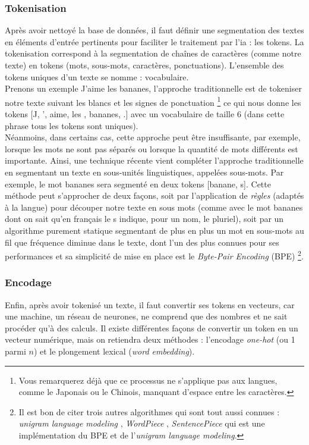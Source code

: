\documentclass[12pt, twoside]{report}
\begin{document}
\subsubsection{Tokenisation}
Après avoir nettoyé la base de données, il faut définir une segmentation des textes en éléments d'entrée pertinents pour faciliter le traitement par l'\Gls{ia} : les \glspl{token}. La tokenisation correspond à la segmentation de chaînes de caractères (comme notre texte) en tokens (mots, sous-mots, caractères, ponctuations). L'ensemble des tokens uniques d'un texte se nomme : vocabulaire.\\
\indent Prenons un exemple \og J'aime les bananes\fg, l'approche traditionnelle est de tokeniser notre texte suivant les blancs et les signes de ponctuation \footnote{Vous remarquerez déjà que ce processus ne s'applique pas aux langues, comme le Japonais ou le Chinois, manquant d'espace entre les caractères.} ce qui nous donne les tokens [\og J\fg, \og '\fg, \og aime\fg, \og les \fg, \og bananes\fg, \og .\fg] avec un vocabulaire de taille 6 (dans cette phrase tous les tokens sont uniques).\\
\indent Néanmoins, dans certains cas, cette approche peut être insuffisante, par exemple, lorsque les mots ne sont pas séparés ou lorsque la quantité de mots différents est importante. Ainsi, une technique récente vient compléter l'approche traditionnelle en segmentant un texte en sous-unités linguistiques, appelées sous-mots. Par exemple, le mot \og bananes\fg{} sera segmenté en deux tokens [\og banane\fg, \og s\fg]. Cette méthode peut s'approcher de deux façons, soit par l'application de \textit{règles} (adaptés à la langue) pour découper notre texte en sous mots (comme avec le mot \og bananes\fg{} dont on sait qu'en français le \og s\fg{} indique, pour un nom, le pluriel), soit par un algorithme purement statique segmentant de plus en plus un mot en sous-mots au fil que fréquence diminue dans le texte, dont l'un des plus connues pour ses performances et sa simplicité de mise en place est le \textit{Byte-Pair Encoding} (BPE) \autocite{bpe}\footnote{Il est bon de citer trois autres algorithmes qui sont tout aussi connues : \textit{unigram language modeling} \autocite{unigramkudo2018}, \textit{WordPiece}  \autocite{wordpiece}, \textit{SentencePiece} \autocite{sentencepiece} qui est une implémentation du BPE et de l'\textit{unigram language modeling}.}.

\subsubsection{Encodage}
Enfin, après avoir tokenisé un texte, il faut convertir ses tokens en vecteurs, car une machine, un réseau de neurones, ne comprend que des nombres et ne sait procéder qu'à des calculs. Il existe différentes façons de convertir un \gls{token} en un vecteur numérique, mais on retiendra deux méthodes : l'encodage \textit{one-hot} (ou 1 parmi $n$) et le plongement lexical (\textit{word embedding}).\\
\end{document}
